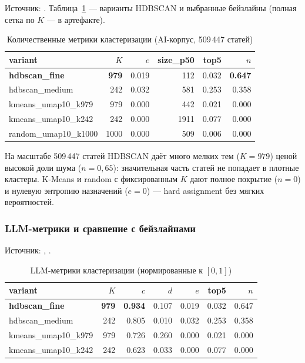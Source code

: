 Источник: . Таблица~\ref{tab:quant-cluster} — варианты
HDBSCAN и выбранные бейзлайны (полная сетка по $K$ — в артефакте).

\begin{table}[ht]
\caption{Количественные метрики кластеризации (AI-корпус, 509\,447 статей)}
\label{tab:quant-cluster}
\centering
\footnotesize
\setlength{\tabcolsep}{3pt}
\begin{tabular}{lrrrrr}
\toprule
variant & $K$ & $e$ & size\_p50 & top5 & $n$ \\
\midrule
\textbf{hdbscan\_fine}   & \textbf{979} & 0.019 & 112   & 0.032 & \textbf{0.647} \\
hdbscan\_medium          & 242 & 0.032 & 581   & 0.253 & 0.358 \\
kmeans\_umap10\_k979     & 979 & 0.000 & 442   & 0.021 & 0.000 \\
kmeans\_umap10\_k242     & 242 & 0.000 & 1911  & 0.077 & 0.000 \\
random\_umap10\_k1000    & 1000 & 0.000 & 509   & 0.006 & 0.000 \\
\bottomrule
\end{tabular}
\end{table}

На масштабе 509\,447 статей HDBSCAN даёт много мелких тем ($K = 979$) ценой высокой доли шума
($n = 0{,}65$): значительная часть статей не попадает в плотные кластеры. K-Means и random с
фиксированным $K$ дают полное покрытие ($n = 0$) и нулевую энтропию назначений ($e = 0$) — hard
assignment без мягких вероятностей.

\subsubsection{LLM-метрики и сравнение с бейзлайнами}

Источник: , .

\begin{table}[ht]
\caption{LLM-метрики кластеризации (нормированные к $[0,1]$)}
\label{tab:llm-cluster}
\centering
\footnotesize
\setlength{\tabcolsep}{3pt}
\begin{tabular}{lrrrrrr}
\toprule
variant & $K$ & $\hat{c}$ & $d$ & $e$ & top5 & $n$ \\
\midrule
\textbf{hdbscan\_fine}   & \textbf{979} & \textbf{0.934} & 0.107 & 0.019 & 0.032 & 0.647 \\
hdbscan\_medium          & 242 & 0.805 & 0.010 & 0.032 & 0.253 & 0.358 \\
kmeans\_umap10\_k979     & 979 & 0.726 & 0.260 & 0.000 & 0.021 & 0.000 \\
kmeans\_umap10\_k242     & 242 & 0.623 & 0.033 & 0.000 & 0.077 & 0.000 \\
\bottomrule
\end{tabular}
\end{table}

